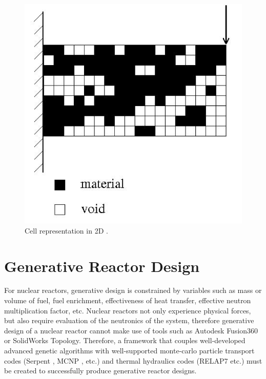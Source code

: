 \documentclass[letterpaper,11pt]{article}
\begin{document}
\begin{figure}[]
	\begin{center}
		\includegraphics[scale=0.25]{./figures/cell.png}
        \end{center}	
        \caption{Cell representation in 2D \cite{renner_genetic_2003}.}
        \label{fig:cell}
\end{figure}

\section{Generative Reactor Design}
For nuclear reactors, generative design is constrained by 
variables such as mass or volume of fuel, fuel enrichment, effectiveness 
of heat transfer, effective neutron multiplication factor, etc. 
Nuclear reactors not only experience physical forces, but also
require evaluation of the neutronics of the system, therefore generative design of 
a nuclear reactor cannot make use of tools such as Autodesk Fusion360 or SolidWorks 
Topology. 
Therefore, a framework that couples well-developed advanced genetic algorithms 
with well-supported monte-carlo particle transport 
codes (Serpent \cite{leppanen_serpent_2014}, 
MCNP \cite{werner_mcnp6._2018}, etc.) and thermal hydraulics 
codes (RELAP7 \cite{andrs_relap-7_2012} etc.)
must be created to successfully produce generative reactor designs. 
\end{document}
